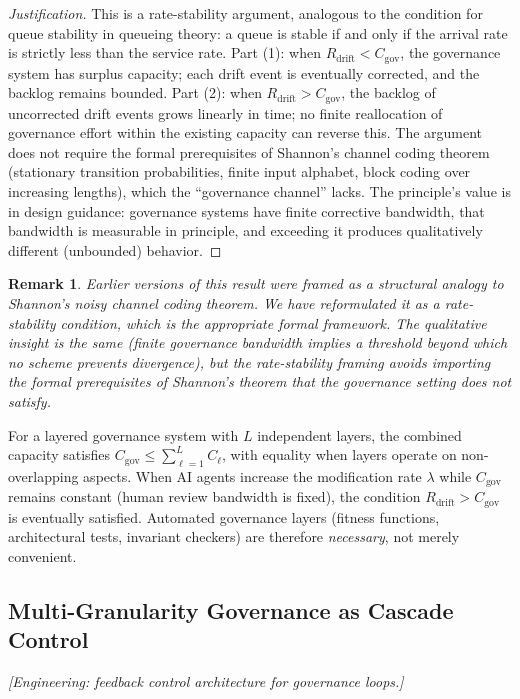 \documentclass[11pt, a4paper]{googledeepmind}
\newtheorem*{remark}{Remark}
\begin{document}
\begin{proof}[Justification]
This is a rate-stability argument, analogous to the condition for queue stability in queueing theory: a queue is stable if and only if the arrival rate is strictly less than the service rate. Part (1): when $R_{\text{drift}} < C_{\text{gov}}$, the governance system has surplus capacity; each drift event is eventually corrected, and the backlog remains bounded. Part (2): when $R_{\text{drift}} > C_{\text{gov}}$, the backlog of uncorrected drift events grows linearly in time; no finite reallocation of governance effort within the existing capacity can reverse this. The argument does not require the formal prerequisites of Shannon's channel coding theorem (stationary transition probabilities, finite input alphabet, block coding over increasing lengths), which the ``governance channel'' lacks. The principle's value is in design guidance: governance systems have finite corrective bandwidth, that bandwidth is measurable in principle, and exceeding it produces qualitatively different (unbounded) behavior.
\end{proof}

\begin{remark}
Earlier versions of this result were framed as a structural analogy to Shannon's noisy channel coding theorem. We have reformulated it as a rate-stability condition, which is the appropriate formal framework. The qualitative insight is the same (finite governance bandwidth implies a threshold beyond which no scheme prevents divergence), but the rate-stability framing avoids importing the formal prerequisites of Shannon's theorem that the governance setting does not satisfy.
\end{remark}

For a layered governance system with $L$ independent layers, the combined capacity satisfies $C_{\text{gov}} \leq \sum_{\ell=1}^{L} C_\ell$, with equality when layers operate on non-overlapping aspects. When AI agents increase the modification rate $\lambda$ while $C_{\text{gov}}$ remains constant (human review bandwidth is fixed), the condition $R_{\text{drift}} > C_{\text{gov}}$ is eventually satisfied. Automated governance layers (fitness functions, architectural tests, invariant checkers) are therefore \emph{necessary}, not merely convenient.

\subsection{Multi-Granularity Governance as Cascade Control}
\emph{[Engineering: feedback control architecture for governance loops.]}
\end{document}
